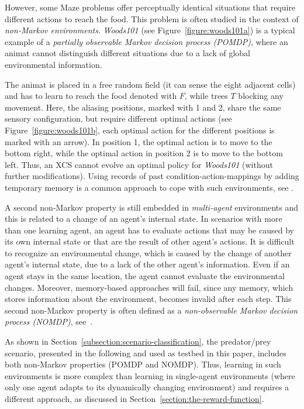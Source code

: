 However, some Maze problems offer perceptually identical situations that require different actions to reach the food. This problem is often studied in the context of \emph{non-Markov environments}. \emph{Woods101} (see Figure~\ref{figure:woods101a}) is a typical example of a \emph{partially observable Markov decision process (POMDP)}, where an animat cannot distinguish different situations due to a lack of global environmental information. 

The animat is placed in a free random field (it can sense the eight adjacent cells) and has to learn to reach the food denoted with $F$, while trees $T$ blocking any movement. Here, the aliasing positions, marked with 1 and 2, share the same sensory configuration, but require different optimal actions (see Figure~\ref{figure:woods101b}, each optimal action for the different positions is marked with an arrow). In position 1, the optimal action is to move to the bottom right, while the optimal action in position 2 is to move to the bottom left. Thus, an XCS cannot evolve an optimal policy for \emph{Woods101} (without further modifications). Using records of past condition-action-mappings by adding temporary memory is a common approach to cope with such environments, see \cite{Lan98,LW00}.

A second non-Markov property is still embedded in \emph{multi-agent} environments and this is related to a change of an agent's internal state. In scenarios with more than one learning agent, an agent has to evaluate actions that may be caused by its own internal state or that are the result of other agent's actions. It is difficult to recognize an environmental change, which is caused by the change of another agent's internal state, due to a lack of the other agent's information. Even if an agent stays in the same location, the agent cannot evaluate the environmental changes. Moreover, memory-based approaches will fail, since any memory, which stores information about the environment, becomes invalid after each step. This second non-Markov property is often defined as a \emph{non-observable Markov decision process (NOMDP)}, see~\cite{TTS01}.

As shown in Section~\ref{subsection:scenario-classification}, the predator/prey scenario, presented in the following and used as testbed in this paper, includes both non-Markov properties (POMDP and NOMDP). Thus, learning in such environments is more complex than learning in single-agent environments (where only one agent adapts to its dynamically changing environment) and requires a different approach, as discussed in Section~\ref{section:the-reward-function}.

